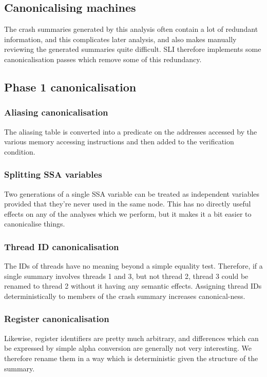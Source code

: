 \documentclass[12pt,a4paper]{book}
\begin{document}
\subsection{Canonicalising machines}

The crash summaries generated by this analysis often contain a lot of redundant information, and this complicates later analysis, and also makes manually reviewing the generated summaries quite difficult.
SLI therefore implements some canonicalisation passes which remove some of this redundancy.


\subsection{Phase 1 canonicalisation}
\subsubsection{Aliasing canonicalisation}
The aliasing table is converted into a predicate on the addresses accessed by the various memory accessing instructions and then added to the verification condition.

\subsubsection{Splitting SSA variables}
Two generations of a single SSA variable can be treated as independent variables provided that they're never used in the same \Phi node.
This has no directly useful effects on any of the analyses which we perform, but it makes it a bit easier to canonicalise things.

\subsubsection{Thread ID canonicalisation}
The IDs of threads have no meaning beyond a simple equality test.
Therefore, if a single summary involves threads 1 and 3, but not thread 2, thread 3 could be renamed to thread 2 without it having any semantic effects.
Assigning thread IDs deterministically to members of the crash summary increases canonical-ness.

\subsubsection{Register canonicalisation}
Likewise, register identifiers are pretty much arbitrary, and differences which can be expressed by simple alpha conversion are generally not very interesting.
We therefore rename them in a way which is deterministic given the structure of the summary.
\end{document}
